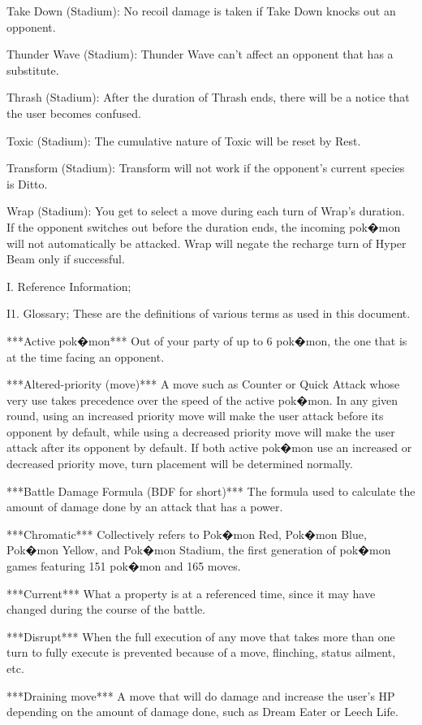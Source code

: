 \documentclass[reprint, aps, prl, paper=A4]{revtex4-1}
\begin{document}
Take Down (Stadium):
No recoil damage is taken if Take Down knocks out an opponent.

Thunder Wave (Stadium):
Thunder Wave can't affect an opponent that has a substitute.

Thrash (Stadium):
After the duration of Thrash ends, there will be a notice that the user becomes confused.

Toxic (Stadium):
The cumulative nature of Toxic will be reset by Rest.

Transform (Stadium):
Transform will not work if the opponent's current species is Ditto.

Wrap (Stadium):
You get to select a move during each turn of Wrap's duration. If the opponent switches out
before the duration ends, the incoming pok�mon will not automatically be attacked. Wrap will
negate the recharge turn of Hyper Beam only if successful.



I. Reference Information;

I1. Glossary;
These are the definitions of various terms as used in this document.

***Active pok�mon***
Out of your party of up to 6 pok�mon, the one that is at the time facing an opponent.

***Altered-priority (move)***
A move such as Counter or Quick Attack whose very use takes precedence over the speed of the
active pok�mon. In any given round, using an increased priority move will make the user attack
before its opponent by default, while using a decreased priority move will make the user attack
after its opponent by default. If both active pok�mon use an increased or decreased priority
move, turn placement will be determined normally.

***Battle Damage Formula (BDF for short)***
The formula used to calculate the amount of damage done by an attack that has a power.

***Chromatic***
Collectively refers to Pok�mon Red, Pok�mon Blue, Pok�mon Yellow, and Pok�mon Stadium, the
first generation of pok�mon games featuring 151 pok�mon and 165 moves.

***Current***
What a property is at a referenced time, since it may have changed during the course of the
battle.

***Disrupt***
When the full execution of any move that takes more than one turn to fully execute is prevented
because of a move, flinching, status ailment, etc.

***Draining move***
A move that will do damage and increase the user's HP depending on the amount of damage done,
such as Dream Eater or Leech Life.
\end{document}
